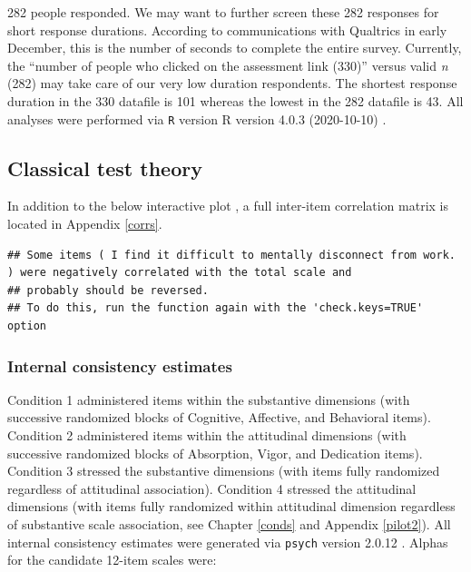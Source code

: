 \documentclass[
]{book}
\begin{document}
282 people responded. We may want to further screen these 282 responses for short response durations. According to communications with Qualtrics in early December, this is the number of seconds to complete the entire survey. Currently, the ``number of people who clicked on the assessment link (330)'' versus valid \emph{n} (282) may take care of our very low duration respondents. The shortest response duration in the 330 datafile is 101 whereas the lowest in the 282 datafile is 43. All analyses were performed via \texttt{R} version R version 4.0.3 (2020-10-10) \citep{R-base}.

\hypertarget{classical-test-theory}{%
\subsection{Classical test theory}\label{classical-test-theory}}

In addition to the below interactive plot \citep[via \texttt{plotly} version 4.9.2.1;][]{R-plotly}, a full inter-item correlation matrix is located in Appendix \ref{corrs}.

\hypertarget{htmlwidget-04a74c64e8bbde197baa}{}

\begin{verbatim}
## Some items ( I find it difficult to mentally disconnect from work. ) were negatively correlated with the total scale and 
## probably should be reversed.  
## To do this, run the function again with the 'check.keys=TRUE' option
\end{verbatim}

\hypertarget{internal-consistency-estimates}{%
\subsubsection{Internal consistency estimates}\label{internal-consistency-estimates}}

Condition 1 administered items within the substantive dimensions (with successive randomized blocks of Cognitive, Affective, and Behavioral items). Condition 2 administered items within the attitudinal dimensions (with successive randomized blocks of Absorption, Vigor, and Dedication items). Condition 3 stressed the substantive dimensions (with items fully randomized regardless of attitudinal association). Condition 4 stressed the attitudinal dimensions (with items fully randomized within attitudinal dimension regardless of substantive scale association, see Chapter \ref{conds} and Appendix \ref{pilot2}). All internal consistency estimates were generated via \texttt{psych} version 2.0.12 \citep{R-psych}. Alphas for the candidate 12-item scales were:
\end{document}
